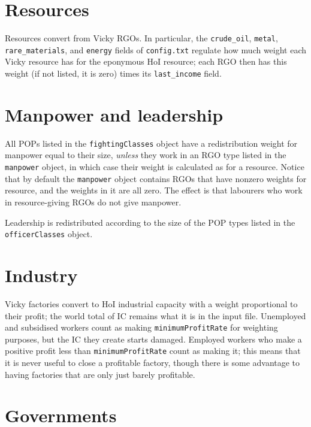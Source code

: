 \documentclass[12pt,ebook,oneside]{book}
\begin{document}
\section{Resources}

Resources convert from Vicky RGOs. In particular, the
\texttt{crude\_oil}, \texttt{metal}, \texttt{rare\_materials}, and
\texttt{energy} fields of \texttt{config.txt} regulate how much weight
each Vicky resource has for the eponymous HoI resource; each RGO then
has this weight (if not listed, it is zero) times its
\texttt{last\_income} field. 

\section{Manpower and leadership}

All POPs listed in the \texttt{fightingClasses} object have a
redistribution weight for manpower equal to their size, \emph{unless}
they work in an RGO type listed in the \texttt{manpower} object, in
which case their weight is calculated as for a resource. Notice that
by default the \texttt{manpower} object contains RGOs that have
nonzero weights for resource, and the weights in it are all zero. The
effect is that labourers who work in resource-giving RGOs do not give
manpower. 

Leadership is redistributed according to the size of the POP types
listed in the \texttt{officerClasses} object. 

\section{Industry} 

Vicky factories convert to HoI industrial capacity with a weight
proportional to their profit; the world total of IC remains what it
is in the input file. Unemployed and subsidised workers count as
making \texttt{minimumProfitRate} for weighting purposes, but the IC
they create starts damaged. Employed workers who make a positive
profit less than \texttt{minimumProfitRate} count as making it; this
means that it is never useful to close a profitable factory, though
there is some advantage to having factories that are only just barely
profitable. 

\section{Governments}
\end{document}
